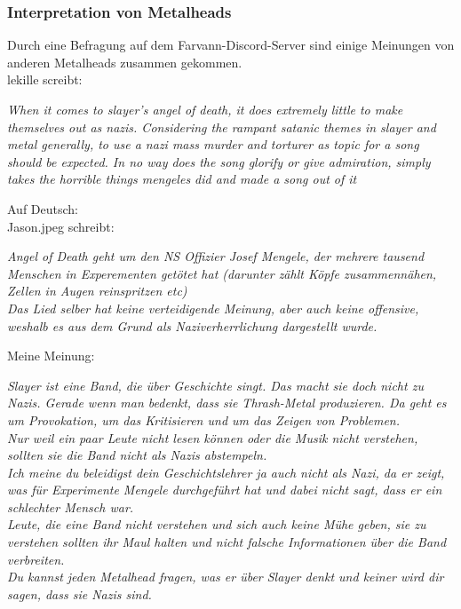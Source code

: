 \documentclass[twocolumn,10pt]{article}
\begin{document}
			\clearpage
			\subsubsection{Interpretation von Metalheads}
			Durch eine Befragung auf dem Farvann-Discord-Server sind einige Meinungen von anderen Metalheads zusammen gekommen.\\
			lekille screibt:
			\begin{center}
			\textit{When it comes to slayer's angel of death, it does extremely little to make themselves out as nazis. Considering the rampant satanic themes in slayer and metal generally, to use a nazi mass murder and torturer as topic for a song should be expected. In no way does the song glorify or give admiration, simply takes the horrible things mengeles did and made a song out of it}	
			\end{center}
			Auf Deutsch: \\
			Jason.jpeg schreibt:
			\begin{center}
				\textit{Angel of Death geht um den NS Offizier Josef Mengele, der mehrere tausend Menschen in Experementen getötet hat (darunter zählt Köpfe zusammennähen, Zellen in Augen reinspritzen etc)}\\
				\textit{Das Lied selber hat keine verteidigende Meinung, aber auch keine offensive, weshalb es aus dem Grund als Naziverherrlichung dargestellt wurde.}
			\end{center}
			Meine Meinung:
			\begin{center}
				\textit{Slayer ist eine Band, die über Geschichte singt. Das macht sie doch nicht zu Nazis. Gerade wenn man bedenkt, dass sie Thrash-Metal produzieren. Da geht es um Provokation, um das Kritisieren und um das Zeigen von Problemen.}\\
				\textit{Nur weil ein paar Leute nicht lesen können oder die Musik nicht verstehen, sollten sie die Band nicht als Nazis abstempeln.}\\
				\textit{Ich meine du beleidigst dein Geschichtslehrer ja auch nicht als Nazi, da er zeigt, was für Experimente Mengele durchgeführt hat und dabei nicht sagt, dass er ein schlechter Mensch war.}\\
				\textit{Leute, die eine Band nicht verstehen und sich auch keine Mühe geben, sie zu verstehen sollten ihr Maul halten und nicht falsche Informationen über die Band verbreiten.}\\
				\textit{Du kannst jeden Metalhead fragen, was er über Slayer denkt und keiner wird dir sagen, dass sie Nazis sind.}
			\end{center}
\end{document}
